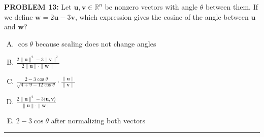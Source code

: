 \documentclass[12pt]{amsart}
\newcommand{\divider}{
  \vspace{-1em} %
  \noindent
  \raisebox{-0.15ex}{\textbullet}%
  \hspace{0.5em}%
  \rule[0.5ex]{0.95\textwidth}{1.0pt}%
  \hspace{0.5em}%
  \raisebox{-0.15ex}{\textbullet}%
  \vspace{0em} %
}
\begin{document}
{\bf PROBLEM 13:}
Let $\mathbf{u}, \mathbf{v} \in \mathbb{R}^n$ be nonzero vectors with angle $\theta$ between them. 
If we define $\mathbf{w} = 2\mathbf{u} - 3\mathbf{v}$, which expression gives the cosine of the angle between $\mathbf{u}$ and $\mathbf{w}$?
%
\begin{enumerate}[(A)]
\item $\cos\theta$ because scaling does not change angles
\item $\displaystyle \frac{2\|\mathbf{u}\|^2 - 3\|\mathbf{v}\|^2}{2\|\mathbf{u}\| \cdot \|\mathbf{w}\|}$
\item $\displaystyle \frac{2 - 3\cos\theta}{\sqrt{4 + 9 - 12\cos\theta}} \cdot \frac{\|\mathbf{u}\|}{\|\mathbf{v}\|}$
\item $\displaystyle \frac{2\|\mathbf{u}\|^2 - 3\langle\mathbf{u},\mathbf{v}\rangle}{\|\mathbf{u}\| \cdot \|\mathbf{w}\|}$
\item $2 - 3\cos\theta$ after normalizing both vectors
\end{enumerate}
%
%
\divider
\end{document}
